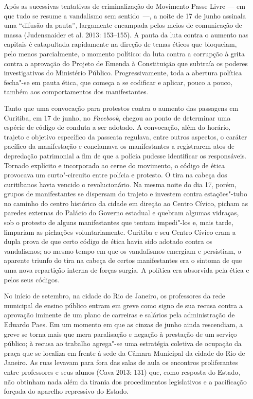 Após as sucessivas tentativas de
criminalização do Movimento Passe Livre --- em que tudo se resume a
vandalismo sem sentido~---, a noite de 17 de junho assinala uma ``difusão
da pauta'', largamente encampada pelos meios de comunicação de massa
(Judensnaider et al. 2013: 153--155). A pauta da luta contra o aumento
nas capitais é catapultada rapidamente na direção de temas éticos que
bloqueiam, pelo menos parcialmente, o momento político: da luta contra a
corrupção à grita contra a aprovação do Projeto de Emenda à Constituição
que subtraía os poderes investigativos do Ministério Público.
Progressivamente, toda a abertura política fecha"-se em pauta ética, que
começa a se codificar e aplicar, pouco a pouco, também aos
comportamentos dos manifestantes.

Tanto que uma convocação para protestos contra o aumento das passagens
em Curitiba, em 17 de junho, no \emph{Facebook}, chegou ao ponto de
determinar uma espécie de código de conduta a ser adotado. A convocação,
além do horário, trajeto e objetivo específico da passeata regulava,
entre outros aspectos, o caráter pacífico da manifestação e conclamava
os manifestantes a registrarem atos de depredação patrimonial a fim de
que a polícia pudesse identificar os responsáveis. Tornado explícito e
incorporado ao cerne do movimento, o código de ética provocava um
curto"-circuito entre polícia e protesto. O tira na cabeça dos
curitibanos havia vencido o revolucionário. Na mesma noite do dia 17,
porém, grupos de manifestantes se dispersam do trajeto e investem contra
estações"-tubo no caminho do centro histórico da cidade em direção ao
Centro Cívico, picham as paredes externas do Palácio do Governo estadual
e quebram algumas vidraças, sob o protesto de alguns manifestantes que
tentam impedi"-los e, mais tarde, limpariam as pichações voluntariamente.
Curitiba e seu Centro Cívico eram a dupla prova de que certo código de
ética havia sido adotado contra os vandalismos; ao mesmo tempo em que os
vandalismos emergiam e persistiam, o aparente triunfo do tira na cabeça
de certos manifestantes era o sintoma de que uma nova repartição interna
de forças surgia. A política era absorvida pela ética e pelos seus
códigos.

No início de setembro, na cidade do Rio de Janeiro, os professores da
rede municipal de ensino público entram em greve como signo de sua
recusa contra a aprovação iminente de um plano de carreiras e salários
pela administração de Eduardo Paes. Em um momento em que as cinzas de
junho ainda rescendiam, a greve se torna mais que mera paralisação e
negação à prestação de um serviço público; à recusa ao trabalho
agrega"-se uma estratégia coletiva de ocupação da praça que se localiza
em frente à sede da Câmara Municipal da cidade do Rio de Janeiro. As
ruas levavam para fora das salas de aula os encontros proliferantes
entre professores e seus alunos (Cava 2013: 131) que, como resposta do
Estado, não obtinham nada além da tirania dos procedimentos legislativos
e a pacificação forçada do aparelho repressivo do Estado.

